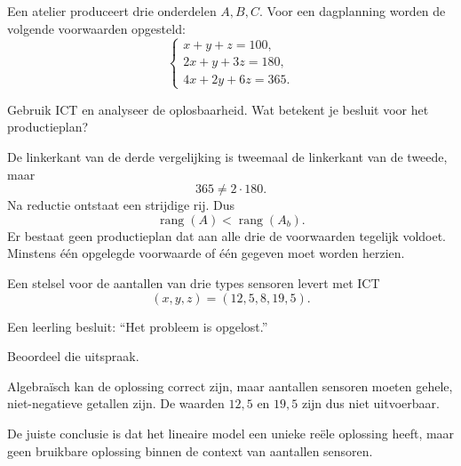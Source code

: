 \documentclass{ximera}
\begin{document}
\begin{oefening}{\oefU\ESS}

Een atelier produceert drie onderdelen \(A,B,C\). Voor een dagplanning
worden de volgende voorwaarden opgesteld:
\[
\begin{cases}
x+y+z=100,\\
2x+y+3z=180,\\
4x+2y+6z=365.
\end{cases}
\]

Gebruik ICT en analyseer de oplosbaarheid. Wat betekent je besluit voor
het productieplan?

\begin{oplossing}
De linkerkant van de derde vergelijking is tweemaal de linkerkant van
de tweede, maar
\[
365\neq2\cdot180.
\]
Na reductie ontstaat een strijdige rij. Dus
\[
\operatorname{rang}(A)<\operatorname{rang}(A_b).
\]
Er bestaat geen productieplan dat aan alle drie de voorwaarden tegelijk voldoet.
Minstens één opgelegde voorwaarde of één gegeven moet worden herzien.
\end{oplossing}
\end{oefening}


\begin{oefening}{\oefU\ESS}

Een stelsel voor de aantallen van drie types sensoren levert met ICT
\[
(x,y,z)=(12{,}5,8,19{,}5).
\]

Een leerling besluit: ``Het probleem is opgelost.''

Beoordeel die uitspraak.

\begin{oplossing}
Algebraïsch kan de oplossing correct zijn, maar aantallen sensoren moeten
gehele, niet-negatieve getallen zijn. De waarden \(12{,}5\) en \(19{,}5\)
zijn dus niet uitvoerbaar.

De juiste conclusie is dat het lineaire model een unieke reële oplossing
heeft, maar geen bruikbare oplossing binnen de context van aantallen sensoren.
\end{oplossing}
\end{oefening}
\end{document}
